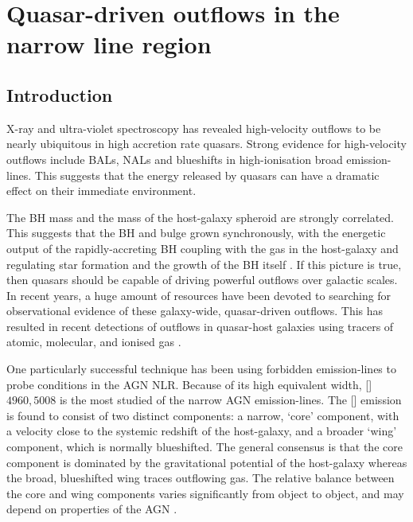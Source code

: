 
\chapter{Quasar-driven outflows in the narrow line region}
\label{ch:nlr} 

\section{Introduction}

X-ray and ultra-violet spectroscopy has revealed high-velocity outflows to be nearly ubiquitous in high accretion rate quasars.
Strong evidence for high-velocity outflows include BALs, NALs and blueshifts in high-ionisation broad emission-lines. 
This suggests that the energy released by quasars can have a dramatic effect on their immediate environment. 

The BH mass and the mass of the host-galaxy spheroid are strongly correlated.
This suggests that the BH and bulge grown synchronously, with the energetic output of the rapidly-accreting BH coupling with the gas in the host-galaxy and regulating star formation and the growth of the BH itself \citep[e.g.][]{silk98,king03,dimatteo05,king15}.
If this picture is true, then quasars should be capable of driving powerful outflows over galactic scales. 
In recent years, a huge amount of resources have been devoted to searching for observational evidence of these galaxy-wide, quasar-driven outflows. 
This has resulted in recent detections of outflows in quasar-host galaxies using tracers of atomic, molecular, and ionised gas \citep[e.g.][]{nesvadba06,arav08,nesvadba08,moe09,dunn10,alexander10,harrison12,harrison14,nesvadba10,rupke13,veilleux13,nardini15,feruglio10,alatalo11,cimatti13,cicone14}.  

One particularly successful technique has been using forbidden emission-lines to probe conditions in the AGN NLR. 
Because of its high equivalent width, []\ll$4960,5008$ is the most studied of the narrow AGN emission-lines. 
The [] emission is found to consist of two distinct components: a narrow, `core' component, with a velocity close to the systemic redshift of the host-galaxy, and a broader `wing' component, which is normally blueshifted. 
The general consensus is that the core component is dominated by the gravitational potential of the host-galaxy whereas the broad, blueshifted wing traces outflowing gas. 
The relative balance between the core and wing components varies significantly from object to object, and may depend on properties of the AGN \citep[e.g. luminosity;][]{shen14}. 

